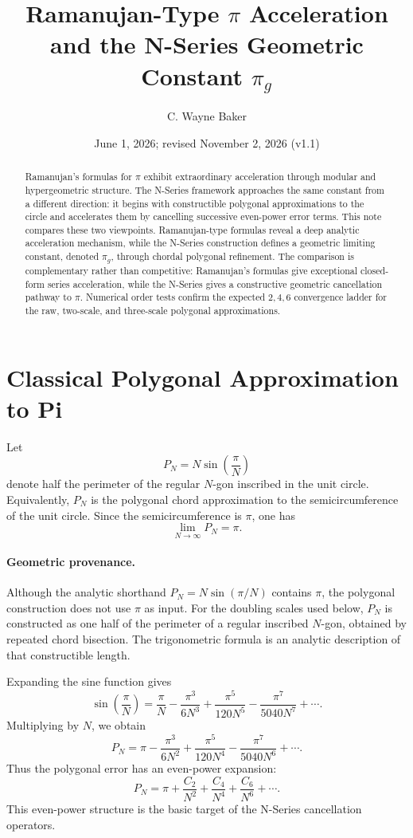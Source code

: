 \documentclass[11pt]{article}
\title{Ramanujan-Type $\pi$ Acceleration and the N-Series Geometric Constant $\pi_g$}
\author{C. Wayne Baker}
\date{June 1, 2026; revised November 2, 2026 (v1.1)}
\begin{document}
\maketitle

\begin{abstract}
Ramanujan's formulas for $\pi$ exhibit extraordinary acceleration through
modular and hypergeometric structure. The N-Series framework approaches the
same constant from a different direction: it begins with constructible
polygonal approximations to the circle and accelerates them by cancelling
successive even-power error terms. This note compares these two viewpoints.
Ramanujan-type formulas reveal a deep analytic acceleration mechanism, while
the N-Series construction defines a geometric limiting constant, denoted
$\pi_g$, through chordal polygonal refinement. The comparison is
complementary rather than competitive: Ramanujan's formulas give exceptional
closed-form series acceleration, while the N-Series gives a constructive
geometric cancellation pathway to $\pi$.
Numerical order tests confirm the expected $2,4,6$ convergence ladder for the
raw, two-scale, and three-scale polygonal approximations.
\end{abstract}

\section{Classical Polygonal Approximation to Pi}

Let
\[
  P_N = N\sin\!\left(\frac{\pi}{N}\right)
\]
denote half the perimeter of the regular $N$-gon inscribed in the unit
circle. Equivalently, $P_N$ is the polygonal chord approximation to the
semicircumference of the unit circle. Since the semicircumference is $\pi$,
one has
\[
  \lim_{N\to\infty} P_N = \pi .
\]

\paragraph{Geometric provenance.}
Although the analytic shorthand $P_N=N\sin(\pi/N)$ contains $\pi$, the
polygonal construction does not use $\pi$ as input. For the doubling scales
used below, $P_N$ is constructed as one half of the perimeter of a regular
inscribed $N$-gon, obtained by repeated chord bisection. The trigonometric
formula is an analytic description of that constructible length.

Expanding the sine function gives
\[
  \sin\!\left(\frac{\pi}{N}\right)
  = \frac{\pi}{N} - \frac{\pi^3}{6N^3} + \frac{\pi^5}{120N^5}
    - \frac{\pi^7}{5040N^7} + \cdots .
\]
Multiplying by $N$, we obtain
\[
  P_N = \pi - \frac{\pi^3}{6N^2} + \frac{\pi^5}{120N^4}
    - \frac{\pi^7}{5040N^6} + \cdots .
\]
Thus the polygonal error has an even-power expansion:
\[
  P_N = \pi + \frac{C_2}{N^2} + \frac{C_4}{N^4} + \frac{C_6}{N^6} + \cdots .
\]
This even-power structure is the basic target of the N-Series cancellation
operators.
\end{document}
